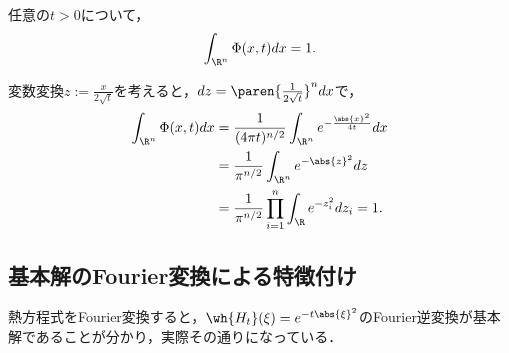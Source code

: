 \documentclass[uplatex,dvipdfmx]{jsreport}
\begin{document}
\begin{lemma}
    任意の$t>0$について，
    \[\int_{\R^n}\Phi(x,t)dx=1.\]
\end{lemma}
\begin{Proof}
    変数変換$z:=\frac{x}{2\sqrt{t}}$を考えると，$dz=\paren{\frac{1}{2\sqrt{t}}}^ndx$で，
    \begin{align*}
        \int_{\R^n}\Phi(x,t)dx&=\frac{1}{(4\pi t)^{n/2}}\int_{\R^n}e^{-\frac{\abs{x}^2}{4t}}dx\\
        &=\frac{1}{\pi^{n/2}}\int_{\R^n}e^{-\abs{z}^2}dz\\
        &=\frac{1}{\pi^{n/2}}\prod_{i=1}^n\int_\R e^{-z^2_i}dz_i=1.
    \end{align*}
\end{Proof}

\subsection{基本解のFourier変換による特徴付け}

\begin{tcolorbox}[colframe=ForestGreen, colback=ForestGreen!10!white,breakable,colbacktitle=ForestGreen!40!white,coltitle=black,fonttitle=\bfseries\sffamily,
title=]
    熱方程式をFourier変換すると，$\wh{H_t}(\xi)=e^{-t\abs{\xi}^2}$のFourier逆変換が基本解であることが分かり，実際その通りになっている．
\end{tcolorbox}
\end{document}
